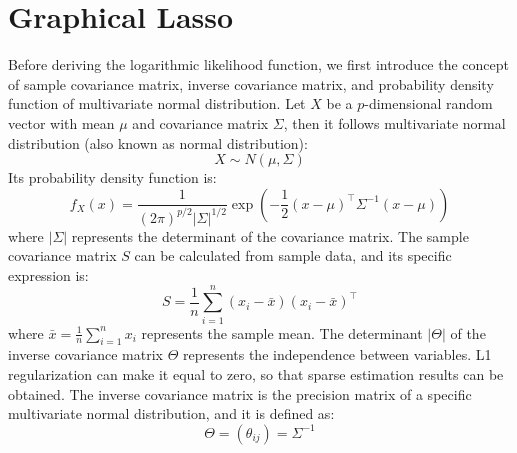 \chapter{Graphical Lasso}
Before deriving the logarithmic likelihood function, we first introduce the concept of sample covariance matrix, inverse covariance matrix, and probability density function of multivariate normal distribution.
Let $X$ be a $p$-dimensional random vector with mean $\mu$ and covariance matrix $\Sigma$, then it follows multivariate normal distribution (also known as normal distribution): $$
	X \sim N(\mu, \Sigma)
$$ Its probability density function is: $$
	f_X(x) = \frac{1}{(2\pi)^{p/2} |\Sigma|^{1/2}} \exp\left(-\frac{1}{2}(x-\mu)^{\top} \Sigma^{-1} (x-\mu)\right)
$$ where $|\Sigma|$ represents the determinant of the covariance matrix.
The sample covariance matrix $S$ can be calculated from sample data, and its specific expression is: $$
	S = \frac{1}{n} \sum_{i=1}^n (x_i - \bar{x})(x_i - \bar{x})^{\top}
$$ where $\bar{x}=\frac{1}{n} \sum_{i=1}^n x_i$ represents the sample mean.
The determinant $|\Theta|$ of the inverse covariance matrix $\Theta$ represents the independence between variables. L1 regularization can make it equal to zero, so that sparse estimation results can be obtained. The inverse covariance matrix is the precision matrix of a specific multivariate normal distribution, and it is defined as: $$
	\Theta = (\theta_{ij}) = \Sigma^{-1}
$$
